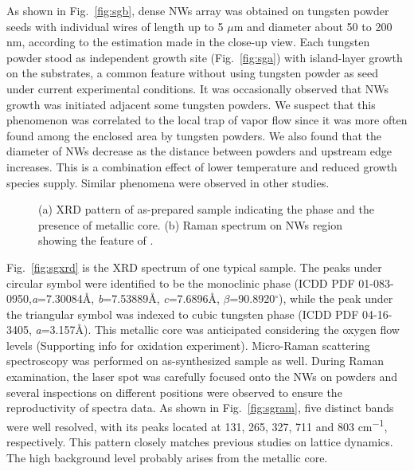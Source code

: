 \documentclass[11pt]{article} %
\begin{document}
As shown in Fig.~\ref{fig:sgb}, dense NWs array was obtained on tungsten powder seeds with individual wires of length up to 5 $\mu$m and diameter about 50 to 200 nm, according to the estimation made in the close-up view. Each tungsten powder stood as independent growth site (Fig.~\ref{fig:sga}) with island-layer growth on the substrates, a common feature without using tungsten powder as seed under current experimental conditions. It was occasionally observed that NWs growth was initiated adjacent some tungsten powders. We suspect that this phenomenon was correlated to the local trap of vapor flow since it was more often found among the enclosed area by tungsten powders. We also found that the diameter of NWs decrease as the distance between powders and upstream edge increases. This is a combination effect of lower temperature and reduced  growth species supply. Similar phenomena were observed in other studies.\cite{Thangala2007}

\begin{figure}[htb]
\centering
{}\hspace{0.04\textwidth}
\caption[Characterization of seeded growth : XRD and Raman]{ (a) XRD pattern of as-prepared sample indicating the  phase and the presence of metallic core. (b) Raman spectrum on NWs region showing the feature of .}
\label{fig:woseedxrd}
\end{figure}

Fig.~\ref{fig:sgxrd} is the XRD spectrum of one typical sample. The peaks under circular symbol were identified to be the monoclinic  phase (ICDD PDF 01-083-0950,\emph{a}=7.30084\AA, \emph{b}=7.53889\AA, \emph{c}=7.6896\AA, $\beta$=90.8920$^\circ$), while the peak under the triangular symbol was indexed to cubic tungsten phase (ICDD PDF 04-16-3405, \emph{a}=3.157\AA). This metallic core was anticipated considering the oxygen flow levels (Supporting info for oxidation experiment). Micro-Raman scattering spectroscopy was performed on as-synthesized sample as well. During Raman examination, the laser spot was carefully focused onto the NWs on powders and several inspections on different positions were observed to ensure the reproductivity of spectra data. As shown in Fig.~\ref{fig:sgram}, five distinct bands were well resolved, with its peaks located at 131, 265, 327, 711 and 803 \si{cm^{-1}}, respectively. This pattern closely matches previous studies on  lattice dynamics.\cite{Salje1975a,Dixit1986} The high background level probably arises from the metallic core.
\end{document}

